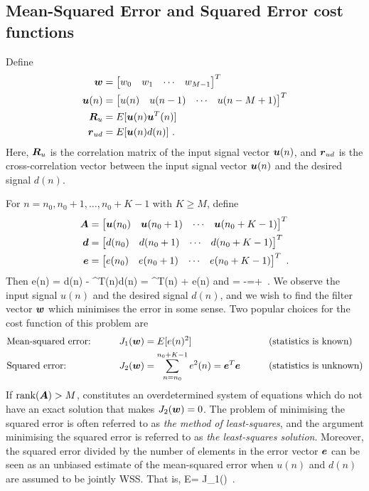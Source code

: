 \subsection{Mean-Squared Error and Squared Error cost functions}
Define
\begin{align}
  \boldsymbol{w} &= \begin{bmatrix} w_0 & w_{1} & \cdots & w_{M-1}\end{bmatrix}^T\\
  \boldsymbol{u}(n)&= \begin{bmatrix} u(n) & u(n-1) & \cdots & u(n-M+1)\end{bmatrix}^T\\
  \boldsymbol{R}_u &= E[\boldsymbol{u}(n)\boldsymbol{u}^T(n)]\\
  \boldsymbol{r}_{ud} &= E[\boldsymbol{u}(n)d(n)]\ .
\end{align}
Here, $\boldsymbol{R}_u$ is the correlation matrix of the input signal vector $\boldsymbol{u}(n)$, and $\boldsymbol{r}_{ud}$ is the cross-correlation vector between the input signal vector $\boldsymbol{u}(n)$ and the desired signal $d(n)$.

For $n=n_0,n_0+1,\ldots,n_0+K-1$ with $K\geq M$, define
\begin{align}
  \boldsymbol{A} &= \begin{bmatrix} \boldsymbol{u}(n_0) & \boldsymbol{u}(n_0+1) & \cdots & \boldsymbol{u}(n_0+K-1)\end{bmatrix}^T\label{eq:ls_phi}\\
  \boldsymbol{d} &= \begin{bmatrix} d(n_0) & d(n_0+1) & \cdots & d(n_0+K-1)\end{bmatrix}^T\label{eq:ls_d}\\
  \boldsymbol{e} &= \begin{bmatrix} e(n_0) & e(n_0+1) & \cdots & e(n_0+K-1)\end{bmatrix}^T\label{eq:ls_e}\ .
\end{align}
Then
\bmath
  e(n) = d(n) - ^T(n)\quad\iff\quad d(n) = ^T(n) + e(n)
\emath
and
\bmath
   = -\quad\iff\quad{}=+\ .
  \label{eq:ls_model}
\emath
We observe the input signal $u(n)$ and the desired signal $d(n)$, and we wish to find the filter vector $\boldsymbol{w}$ which minimises the error in some sense. Two popular choices for the cost function of this problem are
\begin{alignat}{3}
 &\text{Mean-squared error:} &\qquad J_1(\boldsymbol{w}) &= E[e(n)^2] &\qquad &\text{(statistics is known)}\\
 &\text{Squared error:} &\qquad J_2(\boldsymbol{w}) &= \sum_{n=n_0}^{n_0+K-1}e^2(n)=\boldsymbol{e}^T\boldsymbol{e} &\qquad &\text{(statistics is unknown)}
  \label{eq:cf_squared_error}
\end{alignat}
If $\textup{rank}(\boldsymbol{A})>M$,  constitutes an overdetermined system of equations which do not have an exact solution that makes $J_2(\boldsymbol{w})=0$. The problem of minimising the squared error is often referred to as \textit{the method of least-squares}, and the argument minimising the squared error is referred to as \textit{the least-squares solution}. Moreover, the squared error divided by the number of elements in the error vector $\boldsymbol{e}$ can be seen as an unbiased estimate of the mean-squared error when $u(n)$ and $d(n)$ are assumed to be jointly WSS. That is,
\bmath
  E = J_1()\ .
\emath


